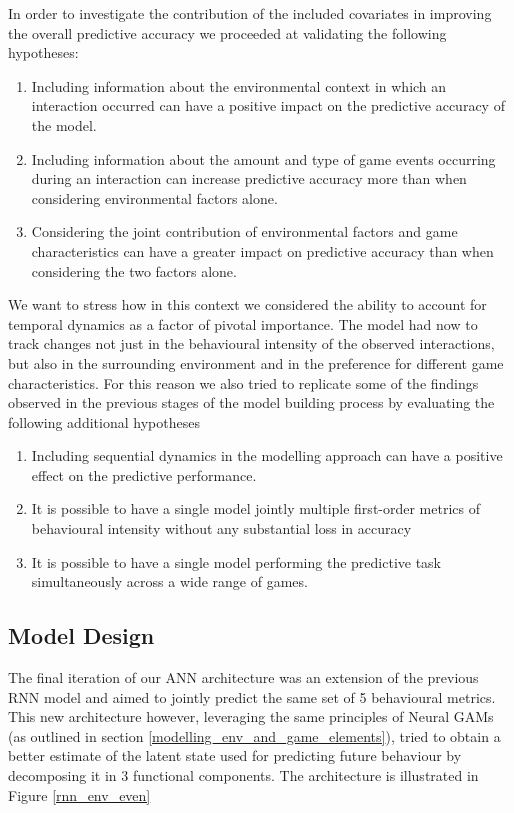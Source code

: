 In order to investigate the contribution of the included covariates in improving the overall predictive accuracy we proceeded at validating the following hypotheses:
\begin{enumerate}
    \item Including information about the environmental context in which an interaction occurred can have a positive impact on the predictive accuracy of the model.
    \item Including information about the amount and type of game events occurring during an interaction can increase predictive accuracy more than when considering environmental factors alone. 
    \item Considering the joint contribution of environmental factors and game characteristics can have a greater impact on predictive accuracy than when considering the two factors alone.  
\end{enumerate}

We want to stress how in this context we considered the ability to account for temporal dynamics as a factor of pivotal importance. The model had now to track changes not just in the behavioural intensity of the observed interactions, but also in the surrounding environment and in the preference for different game characteristics. For this reason we also tried to replicate some of the findings observed in the previous stages of the model building process by evaluating the following additional hypotheses

\begin{enumerate}
    \item Including sequential dynamics in the modelling approach can have a positive effect on the predictive performance.
    \item It is possible to have a single model jointly multiple first-order metrics of behavioural intensity without any substantial loss in accuracy
    \item It is possible to have a single model performing the predictive task simultaneously across a wide range of games.
\end{enumerate}

\subsection{Model Design}
\label{model_design_3}
The final iteration of our ANN architecture was an extension of the previous RNN model and aimed to jointly predict the same set of 5 behavioural metrics. This new architecture however, leveraging the same principles of Neural GAMs (as outlined in section \ref{modelling_env_and_game_elements}), tried to obtain a better estimate of the latent state used for predicting future behaviour by decomposing it in 3 functional components. The architecture is illustrated in Figure \ref{rnn_env_even}

